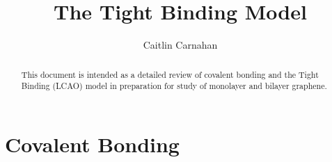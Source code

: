 \documentclass{article}
\title{The Tight Binding Model}
\author{Caitlin Carnahan}
\begin{document}
\maketitle
\begin{abstract}
This document is intended as a detailed review of covalent bonding and the Tight Binding (LCAO) model in preparation for study of monolayer and bilayer graphene.
\end{abstract}
\section{Covalent Bonding}
\end{document}
